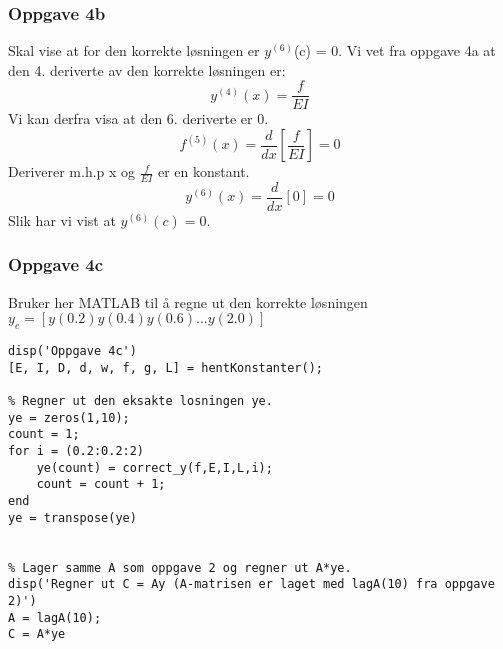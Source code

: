 \subsubsection{Oppgave 4b}
Skal vise at for den korrekte løsningen er $y^{(6)}$(c) = 0. Vi vet fra oppgave 4a at den 4. deriverte av den korrekte løsningen er:
\begin{equation*}
y^{(4)}(x) = \frac{f}{EI}
\end{equation*}
Vi kan derfra visa at den 6. deriverte er 0.
\begin{equation}
f^{(5)}(x) = \frac{d}{dx}[\frac{f}{EI}] = 0
\end{equation}
Deriverer m.h.p x og $\frac{f}{EI}$ er en konstant.
\begin{equation}
y^{(6)}(x) = \frac{d}{dx}[0] = 0
\end{equation}
Slik har vi vist at $y^{(6)}(c) = 0$.

\subsubsection{Oppgave 4c}
Bruker her MATLAB til å regne ut den korrekte løsningen $y_e = [y(0.2) y(0.4) y(0.6) ... y(2.0)]$ 
\begin{lstlisting}
disp('Oppgave 4c')
[E, I, D, d, w, f, g, L] = hentKonstanter();

% Regner ut den eksakte losningen ye.
ye = zeros(1,10);
count = 1;
for i = (0.2:0.2:2)
    ye(count) = correct_y(f,E,I,L,i);
    count = count + 1;
end
ye = transpose(ye)


% Lager samme A som oppgave 2 og regner ut A*ye.
disp('Regner ut C = Ay (A-matrisen er laget med lagA(10) fra oppgave 2)')
A = lagA(10);
C = A*ye
\end{lstlisting}


